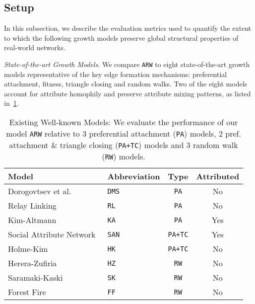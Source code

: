 \vspace{-10pt}
\subsection{Setup}
\label{sub:Experimental Setup}

In this subsection, we describe the evaluation metrics used to quantify the extent to
which the following growth models preserve global structural properties of real-world networks.

\textit{State-of-the-art Growth Models}. We compare \texttt{ARW} to eight state-of-the-art
growth models representative of the key edge formation
mechanisms: preferential attachment, fitness, triangle closing and random walks.
Two of the eight models account for attribute homophily and preserve attribute mixing patterns,
as listed in~\cref{table:models}.

\begin{table}
 \center
 {
  \begin{tabular}[c]{llcc} \toprule
  Model &  Abbreviation & Type & Attributed \\ \midrule
  Dorogovtsev et al.~\cite{dorogovtsev2000structure} & \texttt{DMS} & \texttt{PA} & No  \\
  Relay Linking~\cite{singh2017relay} 						  & \texttt{RL} & \texttt{PA} & No  \\
  Kim-Altmann~\cite{kim2017effect} 							  & \texttt{KA} & \texttt{PA} & Yes  \\ \midrule
  Social Attribute Network~\cite{gong2012evolution} 	  & \texttt{SAN} & \texttt{PA+TC} & Yes  \\
  Holme-Kim~\cite{holme2002growing} 						  & \texttt{HK} & \texttt{PA+TC} & No  \\ \midrule
  Herera-Zufiria~\cite{herrera2011generating} 				  & \texttt{HZ} & \texttt{RW} & No  \\
  Saramaki-Kaski~\cite{saramaki2004scale} 					  & \texttt{SK} & \texttt{RW} & No  \\
  Forest Fire~\cite{leskovec2005graphs} 					  & \texttt{FF} & \texttt{RW} & No  \\
   \bottomrule
  \end{tabular}
  \caption{
  	  Existing Well-known Models: We evaluate the performance of our model \texttt{ARW} relative to 3 preferential attachment
	  (\texttt{PA}) models, 2 pref. attachment \& triangle closing (\texttt{PA+TC}) models and 3 random walk (\texttt{RW}) models.
  }
  \label{table:models}
 }
 \vspace{-10pt}
\end{table}

